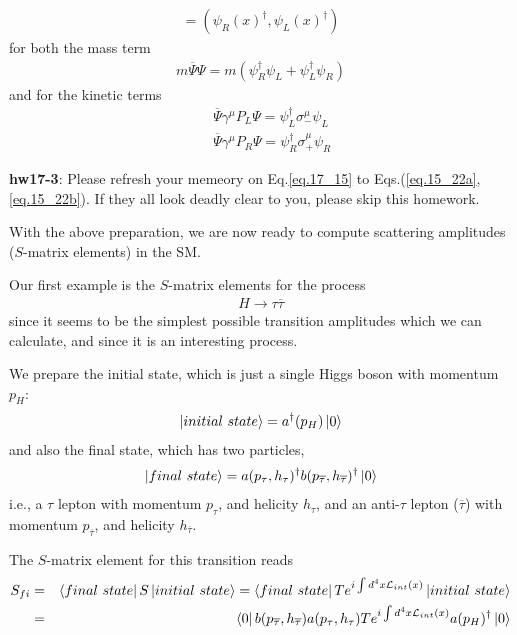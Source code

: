 \documentclass[12pt]{article}
\def\dgr{\dagger}
\begin{document}
\begin{itemize}
\begin{eqnarray}
  = ( \psi_R(x)^\dgr, \psi_L(x)^\dgr ) \label{eq.17_20}
\end{eqnarray}
for both the mass term
\begin{eqnarray}
  m  {\overline \Psi} \Psi = m (\psi_R^\dgr \psi_L + \psi_L^\dgr \psi_R) \label{eq.17_21}
\end{eqnarray}
and for the kinetic terms
\begin{eqnarray}
  && {\overline \Psi} \gamma^\mu P_L \Psi = \psi_L^\dgr \sigma_-^\mu \psi_L \label{eq.17_22a} \\
  && {\overline \Psi} \gamma^\mu P_R \Psi = \psi_R^\dgr \sigma_+^\mu \psi_R \label{eq.17_22b}
\end{eqnarray}
\end{itemize}
 
{\bf hw17-3}: Please refresh your memeory on Eq.\ref{eq.17_15} to Eqs.(\ref{eq.15_22a},\ref{eq.15_22b}).
  If they all look deadly clear to you, please skip this homework.

  With the above preparation, we are now ready to compute scattering
  amplitudes ($S$-matrix elements) in the SM.

  Our first example is the $S$-matrix elements for the process
\begin{eqnarray}
  H \to \tau {\overline \tau} \label{eq.17_23}
\end{eqnarray}
  since it seems to be the simplest possible transition amplitudes
  which we can calculate, and since it is an interesting process.

  We prepare the initial state, which is just a single Higgs boson with
  momentum $p_H$:
\begin{eqnarray}
  \ket{initial~state}= a^\dgr(p_H) \ket{0} \label{eq.17_24}
\end{eqnarray}
  and also the final state, which has two particles,
\begin{eqnarray}
  \ket{final~state}= a(p_\tau,h_\tau)^\dgr b(p_{\overline \tau},h_{\overline \tau})^\dgr \ket{0} \label{eq.17_25}
\end{eqnarray}
   i.e., a $\tau$ lepton with momentum $p_\tau$, and helicity $h_\tau$, and an
  anti-$\tau$ lepton (${\overline \tau}$) with momentum $p_{\overline \tau}$, and helicity $h_{\overline \tau}$.

  The $S$-matrix element for this transition reads
\begin{eqnarray}
  S_{fi}
  &=& \bra{final~state} S \ket{initial~state}
  = \bra{final~state}  T e^{ i\int d^4x {\cal L}_{int}(x) } \ket{initial~state}\\ 
  &=& \bra{0} b(p_{\overline \tau},h_{\overline \tau}) a(p_\tau,h_\tau)
                  T e^{ i\int d^4x {\cal L}_{int}(x) } a(p_H)^\dgr \ket{0} \label{eq.17_26}
\end{eqnarray}
\end{document}
